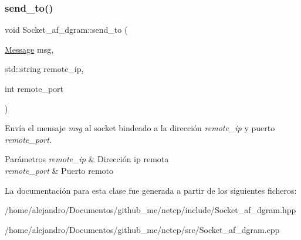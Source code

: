 \subsubsection{\texorpdfstring{send\+\_\+to()}{send\_to()}}
{\footnotesize\ttfamily void Socket\+\_\+af\+\_\+dgram\+::send\+\_\+to (\begin{DoxyParamCaption}\item[{\hyperlink{structMessage}{Message}}]{msg,  }\item[{std\+::string}]{remote\+\_\+ip,  }\item[{int}]{remote\+\_\+port }\end{DoxyParamCaption})}



Envía el mensaje {\itshape msg} al socket bindeado a la dirección {\itshape remote\+\_\+ip} y puerto {\itshape remote\+\_\+port}. 


\begin{DoxyParams}{Parámetros}
{\em remote\+\_\+ip} & Dirección ip remota \\
\hline
{\em remote\+\_\+port} & Puerto remoto \\
\hline
\end{DoxyParams}


La documentación para esta clase fue generada a partir de los siguientes ficheros\+:\begin{DoxyCompactItemize}
\item 
/home/alejandro/\+Documentos/github\+\_\+me/netcp/include/Socket\+\_\+af\+\_\+dgram.\+hpp\item 
/home/alejandro/\+Documentos/github\+\_\+me/netcp/src/Socket\+\_\+af\+\_\+dgram.\+cpp\end{DoxyCompactItemize}
